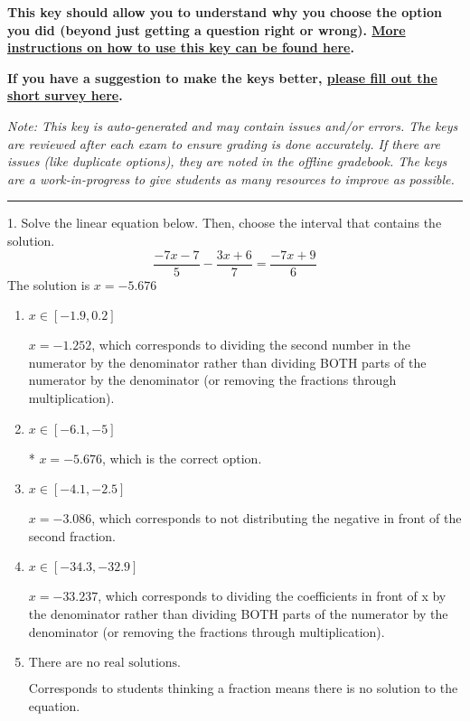 \documentclass{extbook}[14pt]
\begin{document}
\textbf{This key should allow you to understand why you choose the option you did (beyond just getting a question right or wrong). \href{https://xronos.clas.ufl.edu/mac1105spring2020/courseDescriptionAndMisc/Exams/LearningFromResults}{More instructions on how to use this key can be found here}.}

\textbf{If you have a suggestion to make the keys better, \href{https://forms.gle/CZkbZmPbC9XALEE88}{please fill out the short survey here}.}

\textit{Note: This key is auto-generated and may contain issues and/or errors. The keys are reviewed after each exam to ensure grading is done accurately. If there are issues (like duplicate options), they are noted in the offline gradebook. The keys are a work-in-progress to give students as many resources to improve as possible.}

\rule{\textwidth}{0.4pt}

1. Solve the linear equation below. Then, choose the interval that contains the solution.
\[ \frac{-7x -7}{5} - \frac{3x + 6}{7} = \frac{-7x + 9}{6} \] 
The solution is $ x = -5.676 $ 

\begin{enumerate}[label=\Alph*.] 
\item $ x \in [-1.9, 0.2] $ 

  $x = -1.252$, which corresponds to dividing the second number in the numerator by the denominator rather than dividing BOTH parts of the numerator by the denominator (or removing the fractions through multiplication). 
\item $ x \in [-6.1, -5] $ 

 * $x = -5.676$, which is the correct option. 
\item $ x \in [-4.1, -2.5] $ 

  $x = -3.086$, which corresponds to not distributing the negative in front of the second fraction. 
\item $ x \in [-34.3, -32.9] $ 

  $x = -33.237$, which corresponds to dividing the coefficients in front of x by the denominator rather than dividing BOTH parts of the numerator by the denominator (or removing the fractions through multiplication). 
\item $ \text{There are no real solutions.} $ 

 Corresponds to students thinking a fraction means there is no solution to the equation. 
\end{enumerate} 
 
\end{document}
